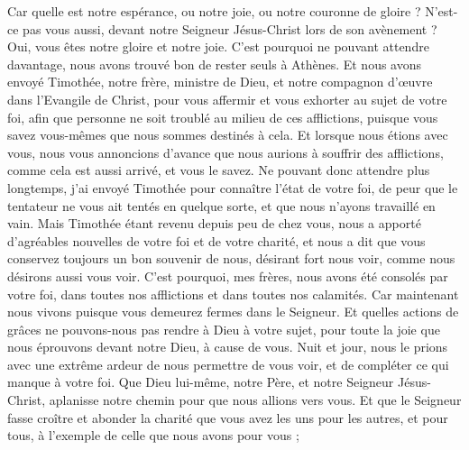 \begin{multicols}{2}
Car quelle est notre espérance, ou notre joie, ou notre couronne de gloire ? N’est-ce pas vous aussi, devant notre Seigneur Jésus-Christ lors de son avènement ?
Oui, vous êtes notre gloire et notre joie.
\VerseOne{}C'est pourquoi ne pouvant attendre davantage, nous avons trouvé bon de rester seuls à Athènes.
Et nous avons envoyé Timothée, notre frère, ministre de Dieu, et notre compagnon d’œuvre dans l'Evangile de Christ, pour vous affermir et vous exhorter au sujet de votre foi,
afin que personne ne soit troublé au milieu de ces afflictions, puisque vous savez vous-mêmes que nous sommes destinés à cela.
Et lorsque nous étions avec vous, nous vous annoncions d’avance que nous aurions à souffrir des afflictions, comme cela est aussi arrivé, et vous le savez.
Ne pouvant donc attendre plus longtemps, j'ai envoyé Timothée pour connaître l'état de votre foi, de peur que le tentateur ne vous ait tentés en quelque sorte, et que nous n’ayons travaillé en vain.
Mais Timothée étant revenu depuis peu de chez vous, nous a apporté d'agréables nouvelles de votre foi et de votre charité, et nous a dit que vous conservez toujours un bon souvenir de nous, désirant fort nous voir, comme nous désirons aussi vous voir.
C'est pourquoi, mes frères, nous avons été consolés par votre foi, dans toutes nos afflictions et dans toutes nos calamités.
Car maintenant nous vivons puisque vous demeurez fermes dans le Seigneur.
Et quelles actions de grâces ne pouvons-nous pas rendre à Dieu à votre sujet, pour toute la joie que nous éprouvons devant notre Dieu, à cause de vous.
Nuit et jour, nous le prions avec une extrême ardeur de nous permettre de vous voir, et de compléter ce qui manque à votre foi.
Que Dieu lui-même, notre Père, et notre Seigneur Jésus-Christ, aplanisse notre chemin pour que nous allions vers vous.
Et que le Seigneur fasse croître et abonder la charité que vous avez les uns pour les autres, et pour tous, à l’exemple de celle que nous avons pour vous ;

\end{multicols}
